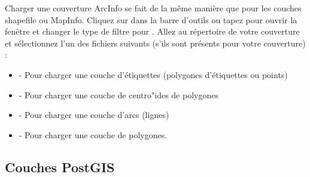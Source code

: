 Charger une couverture ArcInfo se fait de la m\^eme mani\`ere que pour les couches shapefile ou MapInfo. Cliquez sur  dans la barre d'outils ou tapez  pour ouvrir la fen\^etre  et changer le type de filtre pour . Allez au r\'epertoire de votre couverture et s\'electionnez l'un des fichiers suivants (s'ils sont pr\'esents pour votre couverture) :

\begin{itemize}
\item {} - Pour charger une couche d'\'etiquettes (polygones d'\'etiquettes ou points)
\item {} - Pour charger une couche de centro"ides de polygones
\item {} - Pour charger une couche d'arcs (lignes)
\item {} - Pour charger une couche de polygones.
\end{itemize}

\subsection{Couches PostGIS}
\label{label_postgis}

